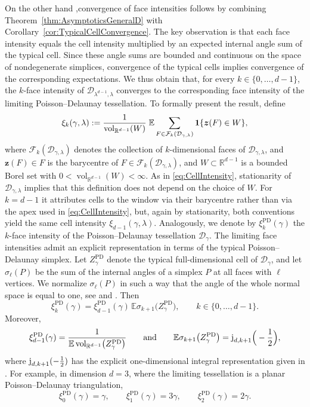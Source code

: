 \documentclass[11pt,a4paper]{article}
\theoremstyle{plain}
\theoremstyle{definition}
\theoremstyle{remark}
\newcommand{\vol}{\mathop{\mathrm{vol}}\nolimits}
\newcommand{\bz}{\boldsymbol{z}}
\def\EE{\mathbb{E}}
\def\RR{\mathbb{R}}
\def\cD{\mathcal{D}}
\begin{document}
On the other hand ,convergence of face intensities follows by combining
Theorem~\ref{thm:AsymptoticsGeneralD} with
Corollary~\ref{cor:TypicalCellConvergence}. The key observation
is that each face intensity equals the cell intensity multiplied
by an expected internal angle sum of the typical cell. Since
these angle sums are bounded and continuous on the space of
nondegenerate simplices, convergence of the typical cells implies
convergence of the corresponding expectations. We thus obtain that, for every
$k\in\{0,\ldots,d-1\}$, the $k$-face intensity of
$\cD_{\lambda^{d-1},\lambda}$ converges to the corresponding face
intensity of the limiting Poisson--Delaunay tessellation. To formally present the result, define
\begin{equation}\label{eqn:k-intensity}
	\xi_k(\gamma,\lambda)
	:=
	\frac{1}{\vol_{\RR^{d-1}}(W)}\;
	\EE
	\sum_{F\in\mathcal F_k(\cD_{\gamma,\lambda})}
	{\bf 1}\{\bz(F)\in W\},
\end{equation}
where $\mathcal F_k(\cD_{\gamma,\lambda})$ denotes the collection of
$k$-dimensional faces of $\cD_{\gamma,\lambda}$, and
$\bz(F)\in F$ is the barycentre of $F\in\mathcal F_k(\cD_{\gamma,\lambda})$, and $W\subset\RR^{d-1}$ is a bounded Borel set with $0<\vol_{\RR^{d-1}}(W)<\infty$. As in \eqref{eq:CellIntensity}, stationarity of $\cD_{\gamma,\lambda}$ implies that this definition does not depend on the choice of $W$. For $k=d-1$ it attributes cells to the window via their barycentre rather than via the apex used in \eqref{eq:CellIntensity}, but, again by stationarity, both conventions yield the same cell intensity $\xi_{d-1}(\gamma,\lambda)$. Analogously, we denote by
$\xi_k^{\operatorname{PD}}(\gamma)$ the $k$-face intensity of the
Poisson--Delaunay tessellation $\cD_\gamma$. The limiting face intensities admit an explicit representation in terms of the
typical Poisson--Delaunay simplex. Let
$Z_\gamma^{\operatorname{PD}}$ denote the typical full-dimensional cell of
$\cD_\gamma$, and let $\sigma_\ell(P)$ be the sum of the internal angles
of a simplex $P$ at all faces with $\ell$ vertices. We normalize $\sigma_\ell(P)$ in such a way that the angle of the whole normal space is equal to one, see \cite[Section 6.1]{GKT22} and \cite[Equation (7.2)]{MT14}. Then
\[
	\xi_k^{\operatorname{PD}}(\gamma)
	=
	\xi_{d-1}^{\operatorname{PD}}(\gamma)\,
	\EE\sigma_{k+1}\bigl(Z_\gamma^{\operatorname{PD}}\bigr),
	\qquad k\in\{0,\ldots,d-1\}.
\]
Moreover,
\[
	\xi_{d-1}^{\operatorname{PD}}(\gamma)
	=
	\frac{1}{\EE\vol_{\RR^{d-1}}\bigl(Z_\gamma^{\operatorname{PD}}\bigr)}\qquad\text{and}\qquad\EE\sigma_{k+1}\bigl(Z_\gamma^{\operatorname{PD}}\bigr)
	=
	\textup{j}_{d,k+1}\Big(-\frac{1}{2}\Big),
\]
where $\textup{j}_{d,k+1}(-\frac{1}{2})$ has the explicit one-dimensional integral
representation given in \cite[Equation~(6.1)]{GKT22}.
For example, in dimension $d=3$, where the limiting tessellation is a planar Poisson--Delaunay triangulation,
\[
	\xi_0^{\operatorname{PD}}(\gamma)=\gamma,\qquad
	\xi_1^{\operatorname{PD}}(\gamma)=3\gamma,\qquad
	\xi_2^{\operatorname{PD}}(\gamma)=2\gamma.
\]
\end{document}

